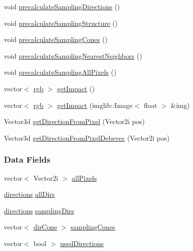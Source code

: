 \begin{DoxyCompactItemize}
\item 
void \hyperlink{classLightprobe_a912f27392e9da6a585e164a5d0666db2}{precalculate\-Sampling\-Directions} ()
\item 
void \hyperlink{classLightprobe_a39ea15d783af5027e86fbbfcbb58c64f}{precalculate\-Sampling\-Structure} ()
\item 
void \hyperlink{classLightprobe_a9d52017afe1d496f4ec4d7f30c080e6c}{precalculate\-Sampling\-Cones} ()
\item 
void \hyperlink{classLightprobe_aeb2723f1e8a00106f4c6b1f43fe52e2a}{precalculate\-Sampling\-Nearest\-Neighbors} ()
\item 
void \hyperlink{classLightprobe_a57d6dca11f80a9c901bf4a43e19c3fc0}{precalculate\-Sampling\-All\-Pixels} ()
\item 
vector$<$ \hyperlink{structrgb}{rgb} $>$ \hyperlink{classLightprobe_aaeb0935fae39511dce1701534eb2b3bd}{get\-Impact} ()
\item 
vector$<$ \hyperlink{structrgb}{rgb} $>$ \hyperlink{classLightprobe_a173c0c970cc98f140f64ada3b50aec35}{get\-Impact} (imglib\-::\-Image$<$ float $>$ \&img)
\item 
\-Vector3d \hyperlink{classLightprobe_adb355d76902749ca80366548c58de258}{get\-Direction\-From\-Pixel} (\-Vector2i pos)
\item 
\-Vector3d \hyperlink{classLightprobe_a67cef2ec8ecd3b915901e8ae6735f52b}{get\-Direction\-From\-Pixel\-Debevec} (\-Vector2i pos)
\end{DoxyCompactItemize}
\subsubsection*{\-Data \-Fields}
\begin{DoxyCompactItemize}
\item 
vector$<$ \-Vector2i $>$ \hyperlink{classLightprobe_a47e0a0ac6509b630c45b26ea50c3bc6a}{all\-Pixels}
\item 
\hyperlink{utils_8h_aac426d8086789d4d7e318436071c9754}{directions} \hyperlink{classLightprobe_a95e255a27e98a2c0b2d4df167365ccdd}{all\-Dirs}
\item 
\hyperlink{utils_8h_aac426d8086789d4d7e318436071c9754}{directions} \hyperlink{classLightprobe_ad3aa93672a623bfb704576c466a7769e}{sampling\-Dirs}
\item 
vector$<$ \hyperlink{structdirCone}{dir\-Cone} $>$ \hyperlink{classLightprobe_a3bf62d3debaba3f19e2587d9e22ce204}{sampling\-Cones}
\item 
vector$<$ bool $>$ \hyperlink{classLightprobe_a9f5c4447d145b52e5fe27d8bd6cdcfca}{used\-Directions}
\end{DoxyCompactItemize}

